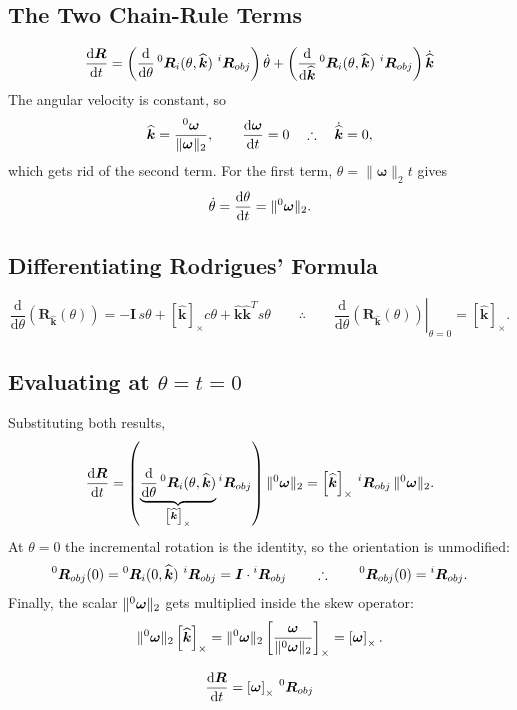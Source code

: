 \documentclass[11pt]{article}
\newcommand{\R}{\bm{R}}
\newcommand{\khat}{\widehat{\bm{k}}}
\newcommand{\wvec}{\bm{\omega}}
\newcommand{\skewx}[1]{\left[#1\right]_{\times}}
\begin{document}
\subsection*{The Two Chain-Rule Terms}
\[
    \frac{\mathrm{d}\R}{\mathrm{d}t}
    = \left(\frac{\mathrm{d}}{\mathrm{d}\theta}\prescript{0}{}{\R}_{i}(\theta,\khat)\,\prescript{i}{}{\R}_{obj}\right)\dot\theta
    + \left(\frac{\mathrm{d}}{\mathrm{d}\khat}\prescript{0}{}{\R}_{i}(\theta,\khat)\,\prescript{i}{}{\R}_{obj}\right)\dot{\khat}
\]
The angular velocity is constant, so
\[
    \khat = \frac{\prescript{0}{}{\wvec}}{\lVert\wvec\rVert_{2}},\qquad \frac{\mathrm{d}\wvec}{\mathrm{d}t}=0
    \quad\therefore\quad \dot{\khat} = 0,
\]
which gets rid of the second term. For the first term, $\theta = \lVert\wvec\rVert_{2}t$ gives
\[
    \dot\theta = \frac{\mathrm{d}\theta}{\mathrm{d}t} = \lVert\prescript{0}{}{\wvec}\rVert_{2}.
\]

\subsection*{Differentiating Rodrigues' Formula}
\[
    \frac{\mathrm{d}}{\mathrm{d}\theta}\left(\R_{\khat}(\theta)\right)
    = -\bm I\,s\theta + \skewx{\khat}c\theta + \khat\khat^{T}s\theta
    \qquad\therefore\qquad
    \left.\frac{\mathrm{d}}{\mathrm{d}\theta}\left(\R_{\khat}(\theta)\right)\right|_{\theta=0} = \skewx{\khat}.
\]

\subsection*{Evaluating at $\theta = t = 0$}
Substituting both results,
\[
    \frac{\mathrm{d}\R}{\mathrm{d}t}
    = \left(\underbrace{\frac{\mathrm{d}}{\mathrm{d}\theta}\prescript{0}{}{\R}_{i}(\theta,\khat)}_{\skewx{\khat}}\prescript{i}{}{\R}_{obj}\right)\lVert\prescript{0}{}{\wvec}\rVert_{2}
    = \skewx{\khat}\,\prescript{i}{}{\R}_{obj}\,\lVert\prescript{0}{}{\wvec}\rVert_{2}.
\]
At $\theta = 0$ the incremental rotation is the identity, so the orientation is unmodified:
\[
    \prescript{0}{}{\R}_{obj}(0) = \prescript{0}{}{\R}_{i}(0,\khat)\,\prescript{i}{}{\R}_{obj} = \bm I\cdot\prescript{i}{}{\R}_{obj}
    \qquad\therefore\qquad \prescript{0}{}{\R}_{obj}(0) = \prescript{i}{}{\R}_{obj}.
\]
Finally, the scalar $\lVert\prescript{0}{}{\wvec}\rVert_{2}$ gets multiplied inside the skew operator:
\[
    \lVert\prescript{0}{}{\wvec}\rVert_{2}\skewx{\khat}
    = \lVert\prescript{0}{}{\wvec}\rVert_{2}\left[\frac{\wvec}{\lVert\prescript{0}{}{\wvec}\rVert_{2}}\right]_{\times}
    = \skewx{\wvec}.
\]
\begin{result}
\[
    \frac{\mathrm{d}\R}{\mathrm{d}t} = \skewx{\wvec}\,\prescript{0}{}{\R}_{obj}
\]
\end{result}
\end{document}
